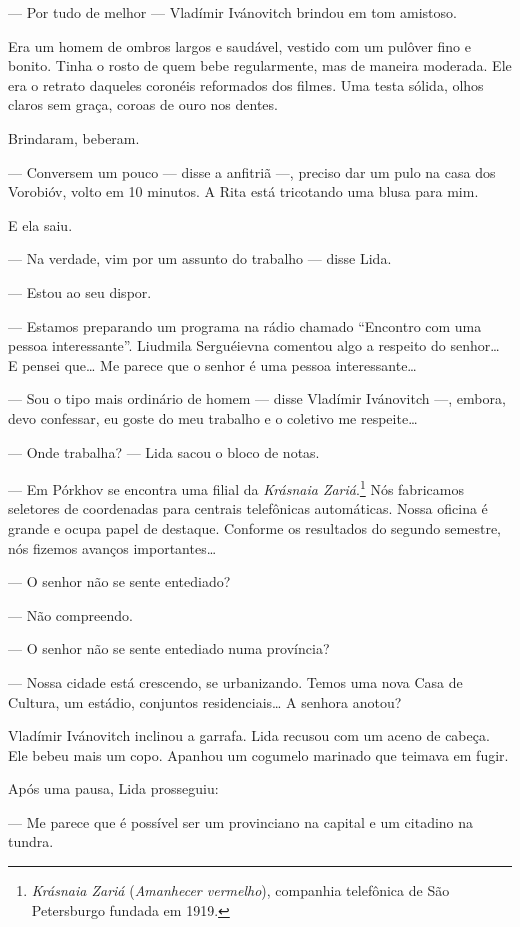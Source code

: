 --- Por tudo de melhor --- Vladímir Ivánovitch brindou em tom amistoso.

Era um homem de ombros largos e saudável, vestido com um pulôver fino e
bonito. Tinha o rosto de quem bebe regularmente, mas de maneira
moderada. Ele era o retrato daqueles coronéis reformados dos filmes. Uma
testa sólida, olhos claros sem graça, coroas de ouro nos dentes.

Brindaram, beberam.

--- Conversem um pouco --- disse a anfitriã ---, preciso dar um pulo na
casa dos Vorobióv, volto em 10 minutos. A Rita está tricotando uma blusa
para mim.

E ela saiu.

--- Na verdade, vim por um assunto do trabalho --- disse Lida.

--- Estou ao seu dispor.

--- Estamos preparando um programa na rádio chamado ``Encontro com uma
pessoa interessante''. Liudmila Serguéievna comentou algo a respeito do
senhor\ldots{} E pensei que\ldots{} Me parece que o senhor é uma pessoa
interessante\ldots{}

--- Sou o tipo mais ordinário de homem --- disse Vladímir Ivánovitch
---, embora, devo confessar, eu goste do meu trabalho e o coletivo me
respeite\ldots{}

--- Onde trabalha? --- Lida sacou o bloco de notas.

--- Em Pórkhov se encontra uma filial da \emph{Krásnaia
Zariá}.\footnote{\emph{Krásnaia Zariá} (\emph{Amanhecer vermelho}),
  companhia telefônica de São Petersburgo fundada em 1919.} Nós
fabricamos seletores de coordenadas para centrais telefônicas
automáticas. Nossa oficina é grande e ocupa papel de destaque. Conforme
os resultados do segundo semestre, nós fizemos avanços importantes\ldots{}

--- O senhor não se sente entediado?

--- Não compreendo.

--- O senhor não se sente entediado numa província?

--- Nossa cidade está crescendo, se urbanizando. Temos uma nova Casa de
Cultura, um estádio, conjuntos residenciais\ldots{} A senhora anotou?

Vladímir Ivánovitch inclinou a garrafa. Lida recusou com um aceno de
cabeça. Ele bebeu mais um copo. Apanhou um cogumelo marinado
que teimava em fugir.

Após uma pausa, Lida prosseguiu:

--- Me parece que é possível ser um provinciano na capital e um citadino
na tundra.

